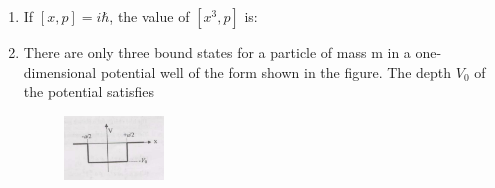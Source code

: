 \documentclass[journal,13pt,onecolumn]{IEEEtran}
\begin{document}
\begin{enumerate}[itemsep = 1em]
\hfill{}

\begin{enumerate}
\end{enumerate}


\item If $[x, p] = i \hbar$, the value of $[x^{3}, p]$ is:

\hfill{}

\begin{enumerate}
\end{enumerate}

\item There are only three bound states for a particle of mass m  in a one-dimensional potential well of the form shown in the figure. The depth $V_0$ of the potential satisfies

\begin{figure}[ht!]
    \centering
    \includegraphics[width=0.25\textwidth]{fig3.jpeg}
    \caption{}
    \label{fig:fig3.jpeg}
\end{figure}

\hfill{}

\begin{enumerate}
{}
\end{enumerate}


\end{enumerate}
\end{document}
